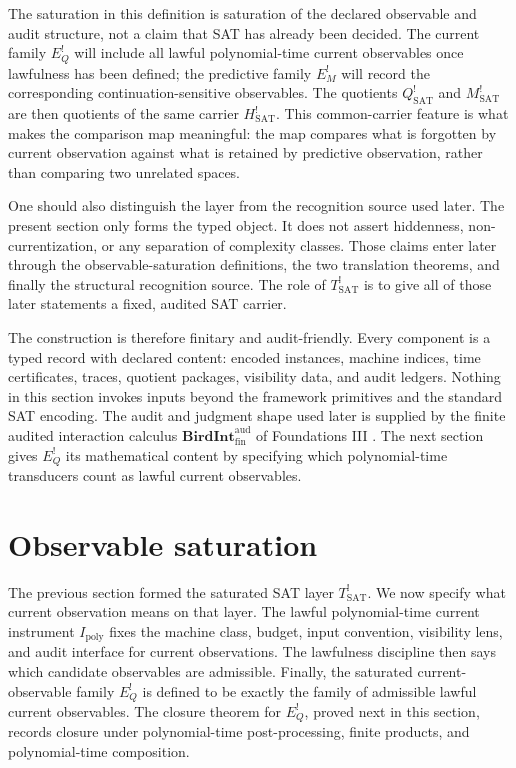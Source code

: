 \documentclass[11pt]{article}
\newcommand{\Tsat}{T^{!}_{\mathrm{SAT}}}
\newcommand{\Hsat}{H^{!}_{\mathrm{SAT}}}
\newcommand{\Ipoly}{I_{\mathrm{poly}}}
\newcommand{\EQbang}{E^{!}_{Q}}
\newcommand{\EMbang}{E^{!}_{M}}
\newcommand{\Qsat}{Q^{!}_{\mathrm{SAT}}}
\newcommand{\Msat}{M^{!}_{\mathrm{SAT}}}
\newcommand{\BirdInt}{\mathbf{BirdInt}^{\mathrm{aud}}_{\mathrm{fin}}}
\theoremstyle{definition}
\begin{document}
The saturation in this definition is saturation of the declared
observable and audit structure, not a claim that SAT has already been
decided.  The current family \(\EQbang\) will include all lawful
polynomial-time current observables once lawfulness has been defined;
the predictive family \(\EMbang\) will record the corresponding
continuation-sensitive observables.  The quotients \(\Qsat\) and
\(\Msat\) are then quotients of the same carrier \(\Hsat\).  This
common-carrier feature is what makes the comparison map meaningful:
the map compares what is forgotten by current observation against what
is retained by predictive observation, rather than comparing two
unrelated spaces.

One should also distinguish the layer from the recognition source used
later.  The present section only forms the typed object.  It does not
assert hiddenness, non-currentization, or any separation of complexity
classes.  Those claims enter later through the observable-saturation
definitions, the two translation theorems, and finally the structural
recognition source.  The role of \(\Tsat\) is to give all of those
later statements a fixed, audited SAT carrier.

The construction is therefore finitary and audit-friendly.  Every
component is a typed record with declared content: encoded instances,
machine indices, time certificates, traces, quotient packages,
visibility data, and audit ledgers.  Nothing in this section invokes
inputs beyond the framework primitives and the standard SAT encoding.
The audit and judgment shape used later is supplied by the finite
audited interaction calculus \(\BirdInt\) of Foundations III
\citep{TsiokosFoundationsIII2026}.  The next section gives
\(\EQbang\) its mathematical content by specifying which
polynomial-time transducers count as lawful current observables.
 

\section{Observable saturation}
\label{sec:observable-saturation}

The previous section formed the saturated SAT layer \(\Tsat\).  We now
specify what current observation means on that layer.  The lawful
polynomial-time current instrument \(\Ipoly\) fixes the machine class,
budget, input convention, visibility lens, and audit interface for
current observations.  The lawfulness discipline then says which
candidate observables are admissible.  Finally, the saturated
current-observable family \(\EQbang\) is defined to be exactly the
family of admissible lawful current observables.  The closure theorem
for \(\EQbang\), proved next in this section, records closure under
polynomial-time post-processing, finite products, and polynomial-time
composition.
\end{document}
